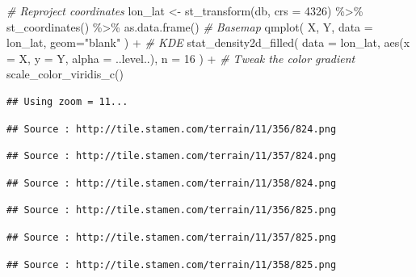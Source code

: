 \documentclass[
]{book}
\newenvironment{Shaded}{\begin{snugshade}}{\end{snugshade}}
\newcommand{\AttributeTok}[1]{\textcolor[rgb]{0.77,0.63,0.00}{#1}}
\newcommand{\CommentTok}[1]{\textcolor[rgb]{0.56,0.35,0.01}{\textit{#1}}}
\newcommand{\DecValTok}[1]{\textcolor[rgb]{0.00,0.00,0.81}{#1}}
\newcommand{\FunctionTok}[1]{\textcolor[rgb]{0.00,0.00,0.00}{#1}}
\newcommand{\NormalTok}[1]{#1}
\newcommand{\OtherTok}[1]{\textcolor[rgb]{0.56,0.35,0.01}{#1}}
\newcommand{\SpecialCharTok}[1]{\textcolor[rgb]{0.00,0.00,0.00}{#1}}
\newcommand{\StringTok}[1]{\textcolor[rgb]{0.31,0.60,0.02}{#1}}
\begin{document}
\begin{Shaded}
\begin{Highlighting}[]
\CommentTok{\# Reproject coordinates}
\NormalTok{lon\_lat }\OtherTok{\textless{}{-}} \FunctionTok{st\_transform}\NormalTok{(db, }\AttributeTok{crs =} \DecValTok{4326}\NormalTok{) }\SpecialCharTok{\%\textgreater{}\%}
  \FunctionTok{st\_coordinates}\NormalTok{() }\SpecialCharTok{\%\textgreater{}\%}
  \FunctionTok{as.data.frame}\NormalTok{()}
\CommentTok{\# Basemap}
\FunctionTok{qmplot}\NormalTok{(}
\NormalTok{  X, }
\NormalTok{  Y, }
  \AttributeTok{data =}\NormalTok{ lon\_lat, }
  \AttributeTok{geom=}\StringTok{"blank"}
\NormalTok{) }\SpecialCharTok{+}
  \CommentTok{\# KDE}
  \FunctionTok{stat\_density2d\_filled}\NormalTok{(}
    \AttributeTok{data =}\NormalTok{ lon\_lat, }
    \FunctionTok{aes}\NormalTok{(}\AttributeTok{x =}\NormalTok{ X, }\AttributeTok{y =}\NormalTok{ Y, }\AttributeTok{alpha =}\NormalTok{ ..level..),}
    \AttributeTok{n =} \DecValTok{16}
\NormalTok{  ) }\SpecialCharTok{+}
  \CommentTok{\# Tweak the color gradient}
  \FunctionTok{scale\_color\_viridis\_c}\NormalTok{()}
\end{Highlighting}
\end{Shaded}

\begin{verbatim}
## Using zoom = 11...
\end{verbatim}

\begin{verbatim}
## Source : http://tile.stamen.com/terrain/11/356/824.png
\end{verbatim}

\begin{verbatim}
## Source : http://tile.stamen.com/terrain/11/357/824.png
\end{verbatim}

\begin{verbatim}
## Source : http://tile.stamen.com/terrain/11/358/824.png
\end{verbatim}

\begin{verbatim}
## Source : http://tile.stamen.com/terrain/11/356/825.png
\end{verbatim}

\begin{verbatim}
## Source : http://tile.stamen.com/terrain/11/357/825.png
\end{verbatim}

\begin{verbatim}
## Source : http://tile.stamen.com/terrain/11/358/825.png
\end{verbatim}
\end{document}
